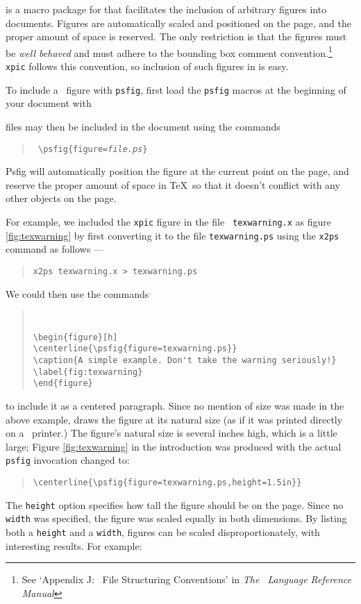 \psfigtex is a macro package for \tex that facilitates the inclusion of
arbitrary \postscript figures into \tex documents. Figures are
automatically scaled and positioned on the page, and the proper amount
of space is reserved. The only restriction is that the \postscript
figures must be {\em well behaved} and
must adhere to the bounding box comment convention.\footnote[1]{
See `Appendix J: \Ps\ File Structuring Conventions' in
{\it The \Ps\ Language Reference Manual}}
{\tt xpic} follows
this convention, so inclusion of such figures in \psfigtex is easy.

To include a \Ps\ figure with {\tt psfig}, first load the {\tt psfig}
macros at the beginning of your document with
\begin{quote}
{\tt\verb++}
\end{quote}
\postscript files may then be included in the document using the commands
\begin{quote}
\tt
{\tt\verb+\+psfig\{figure={\it file.ps}\}}
\end{quote}
Psfig will automatically position the figure at the current point on the page, 
and reserve the proper amount of space in \TeX\ so that it doesn't conflict
with any other objects on the page.

For example, we included the {\tt xpic} figure in the file {\tt
texwarning.x} as figure \ref{fig:texwarning} by first converting it to the
\postscript file {\tt texwarning.ps} using the {\tt x2ps} command as
follows ---
\begin{quote}
\begin{verbatim}
x2ps texwarning.x > texwarning.ps
\end{verbatim}
\end{quote}
We could then use the commands
\begin{quote}
\tt
\begin{verbatim}
\begin{figure}[h]
\centerline{\psfig{figure=texwarning.ps}}
\caption{A simple example. Don't take the warning seriously!}
\label{fig:texwarning}
\end{figure}
\end{verbatim}
\end{quote} 
to include it as a centered paragraph.  Since no mention
of size was made in the above example, \psfigtex draws the figure at
its natural size (as if it was printed directly on a \Ps\ printer.) The
figure's natural size is several inches high, which is a little large;
Figure \ref{fig:texwarning} in the introduction was produced with the actual
{\tt psfig} invocation changed to:
\begin{quote}
\tt\verb+\+centerline\{\verb+\+psfig\{figure=texwarning.ps,height=1.5in\}\}
\end{quote} 
The {\tt height} option specifies how tall the figure
should be on the page. Since no {\tt width} was specified, the figure
was scaled equally in both dimensions. By listing both a {\tt height}
and a {\tt width}, figures can be scaled disproportionately, with
interesting results.  For example:

